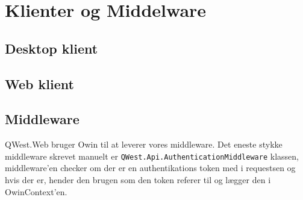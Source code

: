 
\chapter{Klienter og Middelware}\label{ch:clientMiddleware}


\section{Desktop klient}\label{sec:desktopClient}


\section{Web klient}\label{sec:webClient}


\section{Middleware}\label{sec:middleware}
QWest.Web bruger Owin \cite{Owin} til at leverer vores middleware. Det eneste stykke middleware skrevet manuelt er \texttt{QWest.Api.AuthenticationMiddleware} klassen, middleware'en checker om der er en authentikations token med i requestsen og hvis der er, hender den brugen som den token referer til og lægger den i OwinContext'en. 